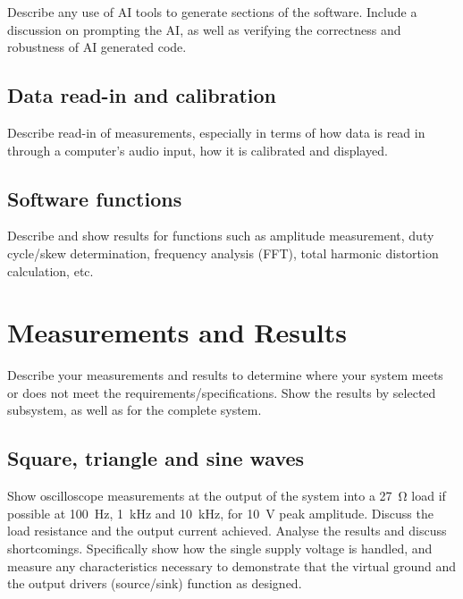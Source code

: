 \documentclass[11pt,a4paper]{article}
\begin{document}
Describe any use of AI tools to generate sections of the software. Include a discussion on prompting the AI, as well as verifying the correctness and robustness of AI generated code.

\subsection{Data read-in and calibration}

Describe read-in of measurements, especially in terms of how data is read in through a computer’s audio input, how it is calibrated and displayed.

\subsection{Software functions}

Describe and show results for functions such as amplitude measurement, duty cycle/skew determination, frequency analysis (FFT), total harmonic distortion calculation, etc.

\newpage
\section{Measurements and Results}

Describe your measurements and results to determine where your system meets or does not meet the requirements/specifications. Show the results by selected subsystem, as well as for the complete system. 

\subsection{Square, triangle and sine waves}

Show oscilloscope measurements at the output of the system into a \SI{27}{\ohm} load if possible at \SI{100}{\hertz}, \SI{1}{\kilo\hertz} and \SI{10}{\kilo\hertz}, for \SI{10}{\volt} peak amplitude. Discuss the load resistance and the output current achieved. Analyse the results and discuss shortcomings. Specifically show how the single supply voltage is handled, and measure any characteristics necessary to demonstrate that the virtual ground and the output drivers (source/sink) function as designed.
\end{document}
